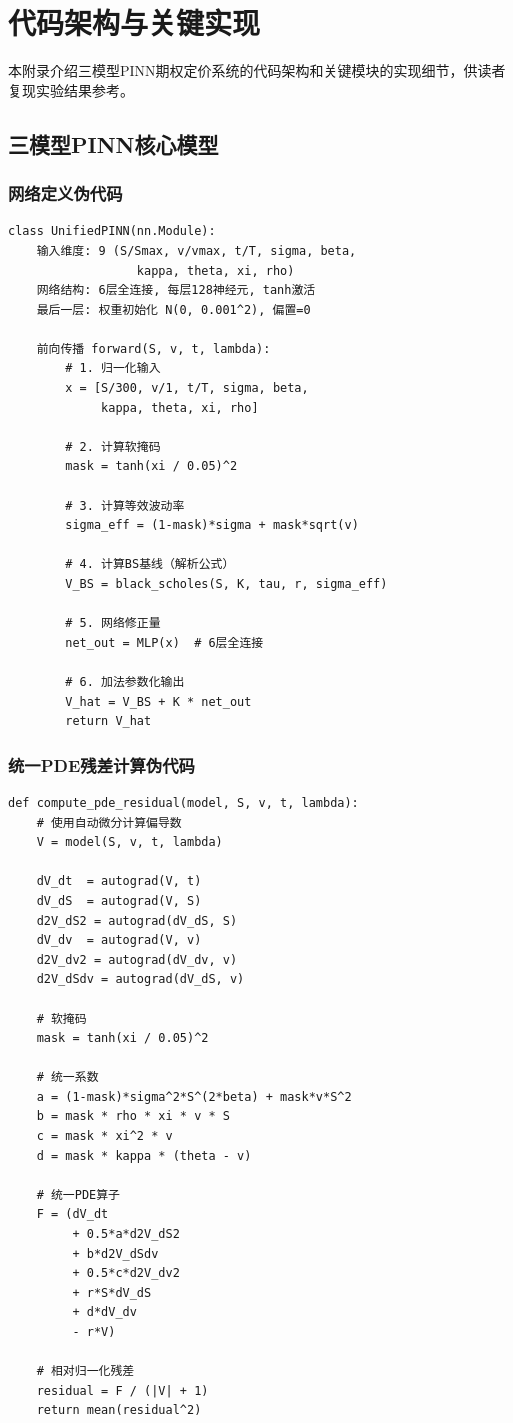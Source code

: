 \chapter{代码架构与关键实现}\label{app:code}

本附录介绍三模型PINN期权定价系统的代码架构和关键模块的实现细节，供读者复现实验结果参考。

\section{三模型PINN核心模型}

\subsection{网络定义伪代码}

\begin{verbatim}
class UnifiedPINN(nn.Module):
    输入维度: 9 (S/Smax, v/vmax, t/T, sigma, beta,
                  kappa, theta, xi, rho)
    网络结构: 6层全连接, 每层128神经元, tanh激活
    最后一层: 权重初始化 N(0, 0.001^2), 偏置=0

    前向传播 forward(S, v, t, lambda):
        # 1. 归一化输入
        x = [S/300, v/1, t/T, sigma, beta,
             kappa, theta, xi, rho]

        # 2. 计算软掩码
        mask = tanh(xi / 0.05)^2

        # 3. 计算等效波动率
        sigma_eff = (1-mask)*sigma + mask*sqrt(v)

        # 4. 计算BS基线（解析公式）
        V_BS = black_scholes(S, K, tau, r, sigma_eff)

        # 5. 网络修正量
        net_out = MLP(x)  # 6层全连接

        # 6. 加法参数化输出
        V_hat = V_BS + K * net_out
        return V_hat
\end{verbatim}

\subsection{统一PDE残差计算伪代码}

\begin{verbatim}
def compute_pde_residual(model, S, v, t, lambda):
    # 使用自动微分计算偏导数
    V = model(S, v, t, lambda)

    dV_dt  = autograd(V, t)
    dV_dS  = autograd(V, S)
    d2V_dS2 = autograd(dV_dS, S)
    dV_dv  = autograd(V, v)
    d2V_dv2 = autograd(dV_dv, v)
    d2V_dSdv = autograd(dV_dS, v)

    # 软掩码
    mask = tanh(xi / 0.05)^2

    # 统一系数
    a = (1-mask)*sigma^2*S^(2*beta) + mask*v*S^2
    b = mask * rho * xi * v * S
    c = mask * xi^2 * v
    d = mask * kappa * (theta - v)

    # 统一PDE算子
    F = (dV_dt
         + 0.5*a*d2V_dS2
         + b*d2V_dSdv
         + 0.5*c*d2V_dv2
         + r*S*dV_dS
         + d*dV_dv
         - r*V)

    # 相对归一化残差
    residual = F / (|V| + 1)
    return mean(residual^2)
\end{verbatim}


